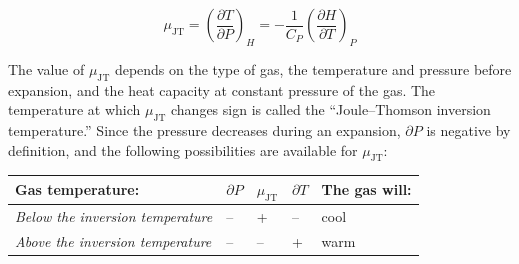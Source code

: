 \documentclass[
  9pt,
]{extbook}
\newcounter{none} %
\theoremstyle{definition}
\theoremstyle{definition}
\theoremstyle{definition}
\theoremstyle{definition}
\theoremstyle{remark}
\begin{document}
\begin{equation}
\mu_{\mathrm{JT}}=\left( \frac{\partial T}{\partial P} \right)_H=-\frac{1}{C_P} \left( \frac{\partial H}{\partial T} \right)_P
\label{eq:muJT}
\end{equation}

The value of \(\mu_{\mathrm{JT}}\) depends on the type of gas, the temperature and pressure before expansion, and the heat capacity at constant pressure of the gas. The temperature at which \(\mu_{\mathrm{JT}}\) changes sign is called the ``Joule--Thomson inversion temperature.'' Since the pressure decreases during an expansion, \(\partial P\) is negative by definition, and the following possibilities are available for \(\mu_{\mathrm{JT}}\):

{\def\LTcaptype{none} %
\begin{longtable}[]{@{}
  >{\raggedright\arraybackslash}p{}
  >{\centering\arraybackslash}p{}
  >{\centering\arraybackslash}p{}
  >{\centering\arraybackslash}p{}
  >{\centering\arraybackslash}p{}@{}}
\toprule\noalign{}
\begin{minipage}[b]{\linewidth}\raggedright
Gas temperature:
\end{minipage} & \begin{minipage}[b]{\linewidth}\centering
\(\partial P\)
\end{minipage} & \begin{minipage}[b]{\linewidth}\centering
\(\mu_{\mathrm{JT}}\)
\end{minipage} & \begin{minipage}[b]{\linewidth}\centering
\(\partial T\)
\end{minipage} & \begin{minipage}[b]{\linewidth}\centering
The gas will:
\end{minipage} \\
\midrule\noalign{}
\endhead
\bottomrule\noalign{}
\endlastfoot
\emph{Below the inversion temperature} & -- & + & -- & cool \\
\emph{Above the inversion temperature} & -- & -- & + & warm \\
\end{longtable}
}
\end{document}
